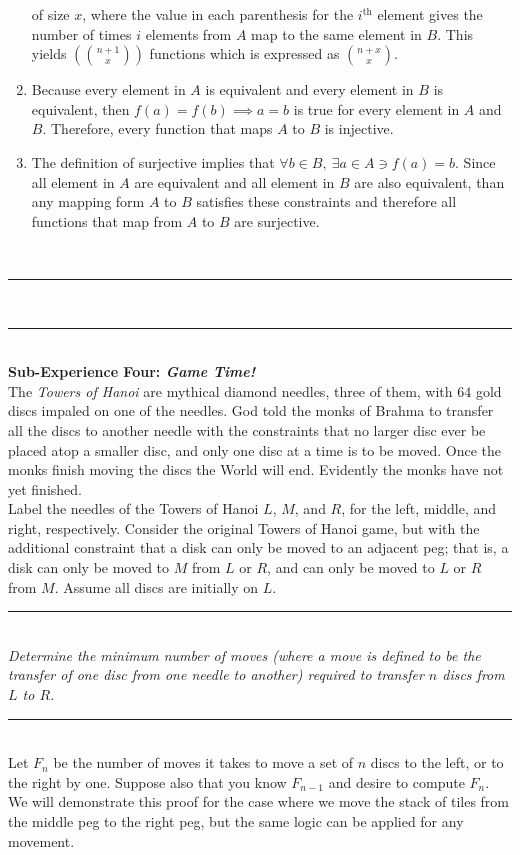 \documentclass{article}
\newcommand{\problemsep}{\leavevmode\\[0.05in] \rule[\baselineskip/4]{\textwidth}{1pt} \\[0.005in] \rule[\baselineskip]{\textwidth}{1pt}\vspace{-\baselineskip/2}\leavevmode\\[0.05in]}
\newcommand{\statementsep}{\leavevmode\\[0.005in] \rule[\baselineskip/4]{\textwidth}{0.4pt}\leavevmode\\[0.005in]}
\begin{document}
\begin{enumerate}
of size $x$, where the value in each parenthesis for the $i^{\text{th}}$ element gives the number of times $i$ elements from $A$ map to the same element in $B$. This yields $\left ({n + 1\choose x} \right )$ functions which is expressed as ${n + x \choose x}$. 
\item Because every element in $A$ is equivalent and every element in $B$ is equivalent, then $f(a) = f(b) \implies a = b$ is true for every element in $A$ and $B$. Therefore, every function that maps $A$ to $B$ is injective.
\item The definition of surjective implies that $\forall b \in B, \ \exists a \in A \ni f(a) = b$. Since all element in $A$ are equivalent and all element in $B$ are also equivalent, than any mapping form $A$ to $B$ satisfies these constraints and therefore all functions that map from $A$ to $B$ are surjective. 
\end{enumerate}
\problemsep
\noindent \maltese \hspace{1ex} {\bf Sub-Experience Four: \emph{Game Time!}}\\
  The \emph{Towers of Hanoi} are 
mythical diamond needles, three of them, with $64$ gold discs impaled on one of the
needles.  God told the monks of Brahma to transfer all the discs to another needle 
with the constraints that no larger disc ever be placed atop a smaller disc, and 
only one disc at a time is to be moved.  Once the monks finish moving the discs the
World will end.  Evidently the monks have not yet finished. \\
\noindent Label the needles of the Towers of Hanoi $L$, $M$,
and $R$, for the left, middle, and right, respectively.
Consider the original Towers of Hanoi game,
but with the additional constraint that a disk can only be moved to an adjacent 
peg; that is, a disk can only be moved to $M$ from $L$ or $R$, and can only be 
moved to $L$ or $R$ from $M$.
Assume all discs are initially on $L$.
\statementsep
\noindent \emph{Determine the minimum number of moves (where a \emph{move} is 
defined to be the transfer of one disc from one needle to another) required to 
transfer $n$ discs from $L$ to $R$.}
\statementsep
Let $F_{n}$ be the number of moves it takes to move a set of $n$ discs to the left, or to the right by one. Suppose also that you know $F_{n-1}$ and desire to compute $F_{n}$.  We will demonstrate this proof for the case where we move the stack of tiles from the middle peg to the right peg, but the same logic can be applied for any movement. \\[0.05in]
\end{document}
